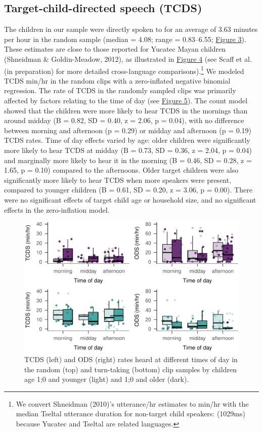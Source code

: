 \documentclass[floatsintext,man]{apa6}
\theoremstyle{definition}
\theoremstyle{definition}
\theoremstyle{definition}
\theoremstyle{remark}
\begin{document}
\subsection{Target-child-directed speech
(TCDS)}\label{target-child-directed-speech-tcds}

The children in our sample were directly spoken to for an average of
3.63 minutes per hour in the random sample (median = 4.08; range =
0.83--6.55; \protect\hyperlink{fig3}{Figure 3}). These estimates are
close to those reported for Yucatec Mayan children (Shneidman \&
Goldin-Meadow, 2012), as illustrated in \protect\hyperlink{fig4}{Figure
4} (see Scaff et al. (in preparation) for more detailed cross-language
comparisons).\footnote{We convert Shneidman (2010)'s utterance/hr
  estimates to min/hr with the median Tseltal utterance duration for
  non-target child speakers: (1029ms) because Yucatec and Tseltal are
  related languages.} We modeled TCDS min/hr in the random clips with a
zero-inflated negative binomial regression. The rate of TCDS in the
randomly sampled clips was primarily affected by factors relating to the
time of day (see \protect\hyperlink{fig5}{Figure 5}). The count model
showed that the children were more likely to hear TCDS in the mornings
than around midday (B = 0.82, SD = 0.40, z = 2.06, p = 0.04), with no
difference between morning and afternoon (p = 0.29) or midday and
afternoon (p = 0.19) TCDS rates. Time of day effects varied by age:
older children were significantly more likely to hear TCDS at midday (B
= 0.73, SD = 0.36, z = 2.04, p = 0.04) and marginally more likely to
hear it in the morning (B = 0.46, SD = 0.28, z = 1.65, p = 0.10)
compared to the afternoons. Older target children were also
significantly more likely to hear TCDS when more speakers were present,
compared to younger children (B = 0.61, SD = 0.20, z = 3.06, p = 0.00).
There were no significant effects of target child age or household size,
and no significant effects in the zero-inflation model.

\begin{figure}
\centering
\includegraphics{Tseltal-CLE_files/figure-latex/fig5-1.pdf}
\caption{\label{fig:fig5}TCDS (left) and ODS (right) rates heard at
different times of day in the random (top) and turn-taking (bottom) clip
samples by children age 1;0 and younger (light) and 1;0 and older
(dark).}
\end{figure}
\end{document}
